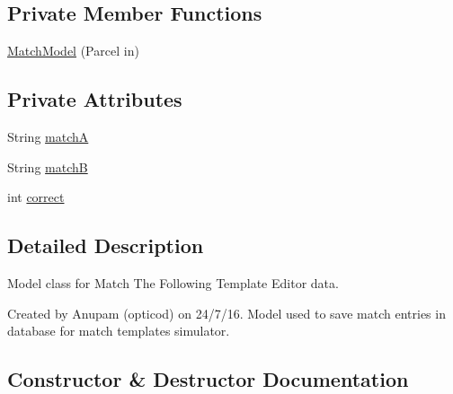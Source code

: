\subsection*{Private Member Functions}
\begin{DoxyCompactItemize}
\item 
\hyperlink{classorg_1_1buildmlearn_1_1toolkit_1_1matchtemplate_1_1data_1_1MatchModel_adb494524010670f2220a9e9df45a8f57}{Match\+Model} (Parcel in)
\end{DoxyCompactItemize}
\subsection*{Private Attributes}
\begin{DoxyCompactItemize}
\item 
String \hyperlink{classorg_1_1buildmlearn_1_1toolkit_1_1matchtemplate_1_1data_1_1MatchModel_a479c6e7b7bbab00213072a02ad3a4893}{matchA}
\item 
String \hyperlink{classorg_1_1buildmlearn_1_1toolkit_1_1matchtemplate_1_1data_1_1MatchModel_a94424270b35968f4b95514d22c157716}{matchB}
\item 
int \hyperlink{classorg_1_1buildmlearn_1_1toolkit_1_1matchtemplate_1_1data_1_1MatchModel_acf82e342f9003f3b513d75de5461670a}{correct}
\end{DoxyCompactItemize}


\subsection{Detailed Description}
Model class for Match The Following Template Editor data. 

Created by Anupam (opticod) on 24/7/16. Model used to save match entries in database for match template\textquotesingle{}s simulator. 

\subsection{Constructor \& Destructor Documentation}

